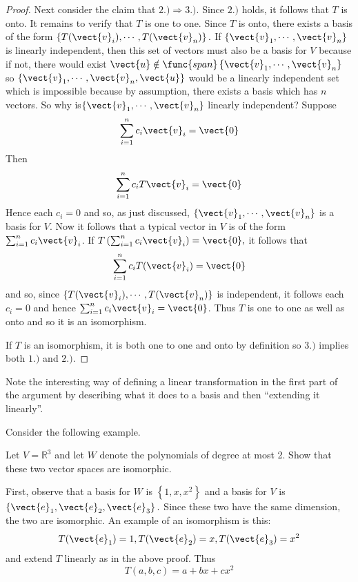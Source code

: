 \begin{proof}
Next consider the claim that $2.)\Rightarrow 3.).$ Since $2.)$ holds, it
follows that $T$ is onto. It remains to verify that $T$ is one to one. Since 
$T$ is onto, there exists a basis of the form $\left\{ T(\vect{v}_{i}),\cdots ,T
(\vect{v}_{n})\right\} .$ If $\left\{ \vect{v}_{1},\cdots ,\vect{v}_{n}\right\} $
is linearly independent, then this set of vectors must also be a basis for $
V $ because if not, there would exist $\vect{u}\notin \func{span}\left\{ \vect{
v}_{1},\cdots ,\vect{v}_{n}\right\} $ so $\left\{ \vect{v}_{1},\cdots ,\vect{v}
_{n},\vect{u}\right\} $ would be a linearly independent set which is
impossible because by assumption, there exists a basis which has $n$
vectors. So why is$\left\{ \vect{v}_{1},\cdots ,\vect{v}_{n}\right\} $
linearly independent? Suppose 
\begin{equation*}
\sum_{i=1}^{n}c_{i}\vect{v}_{i}=\vect{0}
\end{equation*}
Then
\begin{equation*}
\sum_{i=1}^{n}c_{i}T\vect{v}_{i}=\vect{0}
\end{equation*}
Hence each $c_{i}=0$ and so, as just discussed, $\left\{ \vect{v}_{1},\cdots ,
\vect{v}_{n}\right\} $ is a basis for $V$. Now it follows that a typical
vector in $V$ is of the form $\sum_{i=1}^{n}c_{i}\vect{v}_{i}$. If $T\left(
\sum_{i=1}^{n}c_{i}\vect{v}_{i}\right) =\vect{0},$ it follows that 
\begin{equation*}
\sum_{i=1}^{n}c_{i}T(\vect{v}_{i})=\vect{0}
\end{equation*}
and so, since $\left\{ T(\vect{v}_{i}),\cdots ,T(\vect{v}_{n})\right\} $ is
independent, it follows each $c_{i}=0$ and hence $\sum_{i=1}^{n}c_{i}\vect{v}
_{i}=\vect{0}$. Thus $T$ is one to one as well as onto and so it is an
isomorphism.

If $T$ is an isomorphism, it is both one to one and onto by definition so $
3.)$ implies both $1.)$ and $2.)$.
\end{proof}

Note the interesting way of defining a linear transformation in the first
part of the argument by describing what it does to a basis and then
``extending it linearly''.

Consider the following example. 

\begin{example}{}
Let $V=\mathbb{R}^{3}$ and let $W$ denote the polynomials of degree at most
2. Show that these two vector spaces are isomorphic.
\end{example}

\begin{solution}
First, observe that a basis for $W$ is $\left\{ 1,x,x^{2}\right\} $ and a basis for $V$
is $\left\{ \vect{e}_{1},\vect{e}_{2},\vect{e}_{3}\right\} .$ Since these two
have the same dimension, the two are
isomorphic. An example of an isomorphism is this:\ 
\begin{equation*}
T(\vect{e}_{1})=1,T(\vect{e}_{2})=x,T(\vect{e}_{3})=x^{2}
\end{equation*}
and extend $T$ linearly as in the above proof. Thus 
\begin{equation*}
T\left( a,b,c\right) =a+bx+cx^{2}
\end{equation*}
\end{solution}

